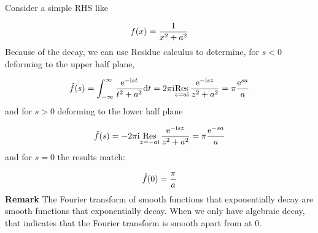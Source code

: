 \documentclass[12pt,landscape]{article}
\def\D{ {\rm d} }
\def\I{ {\rm i} }
\def\E{ {\rm e} }
\def\Res_#1{\underset{#1}{\rm Res}\,}
\def\dt{\D t}
\begin{document}
{Consider a simple RHS like

\[
f(x) = {1 \over x^2 + a^2}
\]
Because of the decay, we can use Residue calculus to determine, for $s < 0$ deforming to the upper half plane,

\[
\hat f(s) = \int_{-\infty}^\infty {\E^{-\I s t} \over t^2 + a^2}\dt = 2 \pi \I \Res_{z = a \I}{\E^{-\I s z} \over z^2 + a^2} = \pi  {\E^{s a} \over a}
\]
and for $s > 0$ deforming to the lower half plane

\[
\hat f(s) =-2 \pi \I \Res_{z =- a \I}{\E^{-\I s z} \over z^2 + a^2} = \pi {\E^{-s a} \over  a}
\]
and for $s = 0$ the results match:

\[
\hat f(0) = {\pi  \over  a}
\]
\newpage
\textbf{Remark} The Fourier transform of smooth functions that exponentially decay are smooth functions that exponentially decay. When we only have algebraic decay, that indicates that the Fourier transform is smooth apart from at $0$.


}
\end{document}
